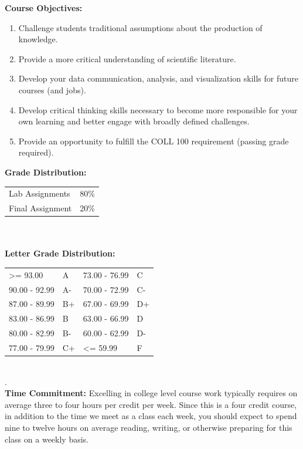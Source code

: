 \documentclass[11pt]{article}
\begin{document}
\textbf {\large Course Objectives:} 
\begin{enumerate} \itemsep-0.4em
  \item Challenge students traditional assumptions about the production of knowledge.
  \item Provide a more critical understanding of scientific literature.
  \item Develop your data communication, analysis, and visualization skills for future courses (and jobs).
  \item Develop critical thinking skills necessary to become more responsible for your own learning and better engage with broadly defined challenges.
  \item Provide an opportunity to fulfill the COLL 100 requirement (passing grade required).
\end{enumerate}
\vspace{8mm}

\textbf {\large Grade Distribution:} \\
\hspace*{40mm}
\begin{tabular}{ l l }
Lab Assignments & 80\% \\
Final Assignment & 20\% \\
\end{tabular} \\\\

\textbf {\large Letter Grade Distribution:} \\
\hspace*{40mm}
\begin{tabular}{ l l | l l }
\textgreater= 93.00 & A & 73.00 - 76.99 & C \\
90.00 - 92.99 & A-  & 70.00 - 72.99 & C- \\
87.00 - 89.99 & B+  & 67.00 - 69.99 & D+ \\
83.00 - 86.99 & B  & 63.00 - 66.99 & D \\
80.00 - 82.99 & B-  & 60.00 - 62.99 & D- \\
77.00 - 79.99 & C+  & \textless= 59.99 & F \\
\end{tabular} \\
.\\

\textbf {\large Time Commitment:} Excelling in college level course work typically requires on average three to four hours per credit per week.  Since this is a four credit course, in addition to the time we meet as a class each week, you should expect to spend nine to twelve hours on average reading, writing, or otherwise preparing for this class on a weekly basis.\\
\end{document}
